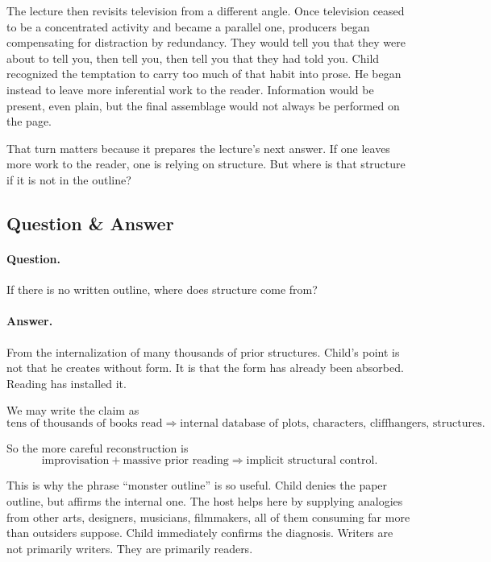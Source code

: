 The lecture then revisits television from a different angle. Once television ceased to be a concentrated activity and became a parallel one, producers began compensating for distraction by redundancy. They would tell you that they were about to tell you, then tell you, then tell you that they had told you. Child recognized the temptation to carry too much of that habit into prose. He began instead to leave more inferential work to the reader. Information would be present, even plain, but the final assemblage would not always be performed on the page.

That turn matters because it prepares the lecture's next answer. If one leaves more work to the reader, one is relying on structure. But where is that structure if it is not in the outline?

\subsection{Question \& Answer}

\paragraph{Question.} If there is no written outline, where does structure come from?

\paragraph{Answer.} From the internalization of many thousands of prior structures. Child's point is not that he creates without form. It is that the form has already been absorbed. Reading has installed it.

We may write the claim as
\begin{equation}
\text{tens of thousands of books read} \Longrightarrow \text{internal database of plots, characters, cliffhangers, structures}.
\end{equation}

So the more careful reconstruction is
\begin{equation}
\text{improvisation} + \text{massive prior reading} \Longrightarrow \text{implicit structural control}.
\end{equation}

This is why the phrase ``monster outline'' is so useful. Child denies the paper outline, but affirms the internal one. The host helps here by supplying analogies from other arts, designers, musicians, filmmakers, all of them consuming far more than outsiders suppose. Child immediately confirms the diagnosis. Writers are not primarily writers. They are primarily readers.

